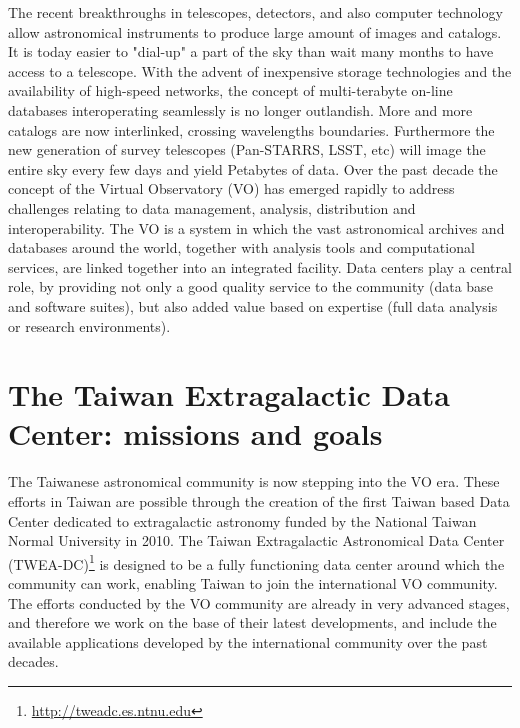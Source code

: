 The recent breakthroughs in telescopes, detectors, and also computer technology allow astronomical instruments to produce large amount of images and catalogs. It is today easier to "dial-up" a part of the sky than wait many months to have access to a telescope. With the advent of inexpensive storage technologies and the availability of high-speed networks, the concept of multi-terabyte on-line databases interoperating seamlessly is no longer outlandish. More and more catalogs are now interlinked, crossing wavelengths boundaries. Furthermore the new generation of survey telescopes (Pan-STARRS, LSST, etc) will image the entire sky every few days and yield Petabytes of data.
Over the past decade the concept of the Virtual Observatory (VO) has emerged rapidly to address challenges relating to data management, analysis, distribution and interoperability. The VO is a system in which the vast astronomical archives and databases around the world, together with analysis tools and computational services, are linked together into an integrated facility. Data centers play a central role, by providing not only a good quality service to the community (data base and software suites), but also added value based on expertise (full data analysis or research environments).

\section{The Taiwan Extragalactic Data Center: missions and goals}

The Taiwanese astronomical community is now stepping into the VO era. These efforts in Taiwan are possible through the creation of the first Taiwan based Data Center dedicated to extragalactic astronomy funded by the National Taiwan Normal University in 2010. The Taiwan Extragalactic Astronomical Data Center (TWEA-DC)\footnote{ \url{http://tweadc.es.ntnu.edu}} is designed to be a fully functioning data center around which the community can work, enabling Taiwan to join the international VO community. The efforts conducted by the VO community are already in very advanced stages, and therefore we work on the base of their latest developments, and include the available applications developed by the international community over the past decades. \\

